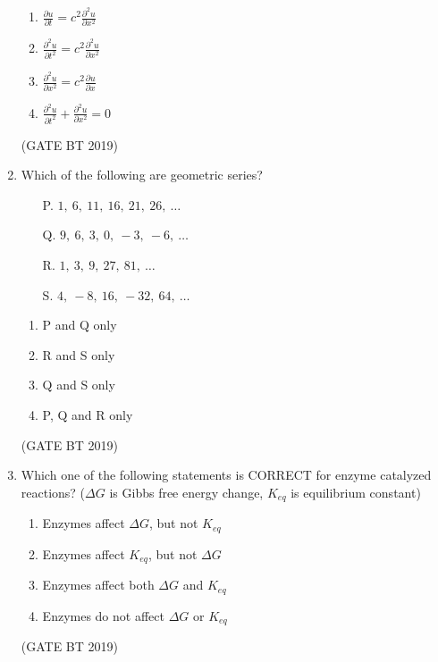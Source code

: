 \documentclass[journal,12pt,onecolumn]{IEEEtran}
\begin{document}
\begin{enumerate}
\begin{multicols}{2}
\begin{enumerate}
\item $\frac{\partial u}{\partial t} = c^2 \frac{\partial^2 u}{\partial x^2}$
\item $\frac{\partial^2 u}{\partial t^2} = c^2 \frac{\partial^2 u}{\partial x^2}$
\item $\frac{\partial^2 u}{\partial x^2} = c^2 \frac{\partial u}{\partial x}$
\item $\frac{\partial^2 u}{\partial t^2} + \frac{\partial^2 u}{\partial x^2} = 0$
\end{enumerate}
\end{multicols}\hfill(GATE BT 2019)

    \item Which of the following are geometric series?
    \begin{itemize}
        \item[P.] $1,\ 6,\ 11,\ 16,\ 21,\ 26,\ \ldots$  
        \item[Q.] $9,\ 6,\ 3,\ 0,\ -3,\ -6,\ \ldots$  
        \item[R.] $1,\ 3,\ 9,\ 27,\ 81,\ \ldots$  
        \item[S.] $4,\ -8,\ 16,\ -32,\ 64,\ \ldots$  
    \end{itemize}
    \begin{multicols}{4}
    \begin{enumerate}[label=(\Alph*)]
        \item P and Q only  
        \item R and S only  
        \item Q and S only  
        \item P, Q and R only  
    \end{enumerate}
    \end{multicols}\hfill(GATE BT 2019)

\item Which one of the following statements is CORRECT for enzyme catalyzed reactions? 
($\Delta G$ is Gibbs free energy change, $K_{eq}$ is equilibrium constant)

\begin{enumerate}
\item Enzymes affect $\Delta G$, but not $K_{eq}$
\item Enzymes affect $K_{eq}$, but not $\Delta G$
\item Enzymes affect both $\Delta G$ and $K_{eq}$
\item Enzymes do not affect $\Delta G$ or $K_{eq}$
\end{enumerate}
\hfill(GATE BT 2019)


\end{enumerate}
\end{document}
